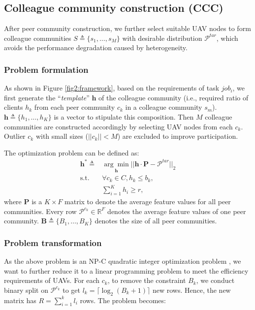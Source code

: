 \documentclass[lettersize,journal]{IEEEtran}
\begin{document}
\subsection{Colleague community construction (CCC)}
After peer community construction, we further select suitable UAV nodes to form colleague communities $S\triangleq\{s_1, \ldots, s_{M}\}$ with desirable distribution $\mathcal{P}^{tar}$, which avoids the performance degradation caused by heterogeneity. 

\subsubsection{Problem formulation}
As shown in Figure \ref{fig2:framework}, based on the requirements of task $job_i$, we first generate the ``\textit{template}'' $\mathbf{h}$ of the colleague community (i.e., required ratio of clients $h_k$ from each peer community $c_k$ in a colleague community $s_{m}$). $\mathbf{h}\triangleq\{h_{1}, \ldots, h_{K}\}$ is a vector to stipulate this composition. Then $M$ colleague communities are constructed accordingly by selecting UAV nodes from each $c_k$. Outlier $c_k$ with small sizes ($\vert\vert c_k\vert\vert< M$) are excluded to improve participation.

The optimization problem can be defined as:
\begin{equation}\label{eq:problem}
\begin{aligned}
\mathbf{h}^*\triangleq &\underset{\mathbf{h}}{\arg \min} \vert\vert \mathbf{h}\cdot\mathbf{P}-\mathcal{P}^{tar}\vert\vert_2 \\
\text{s.t. }& \forall c_k \in C, h_k\leq b_k, \\
&\sum_{i=1} ^K h_i\geq r,
\end{aligned}
\end{equation}
where $\mathbf{P}$ is a $K \times F$ matrix to denote the average feature values for all peer communities. Every row $\mathcal{P}^{c_k}\in \mathbb{R}^F$ denotes the average feature values of one peer community. $\mathbf{B}\triangleq \{ B_{1}, \ldots, B_{K}\}$ denotes the size of all peer communities.

\subsubsection{Problem transformation} As the above problem is an NP-C quadratic integer optimization problem \cite{murty1985some}, we want to further reduce it to a linear programming problem to meet the efficiency requirements of UAVs. 
For each $c_k$, to remove the constraint $B_k$, we conduct binary split on $\mathcal{P}^{c_k}$ to get $l_k=\lceil \log_2(B_k+1) \rceil$ new rows. Hence, the new matrix has $R=\sum_{i=1}^k l_i$ rows. The problem becomes:
\end{document}
